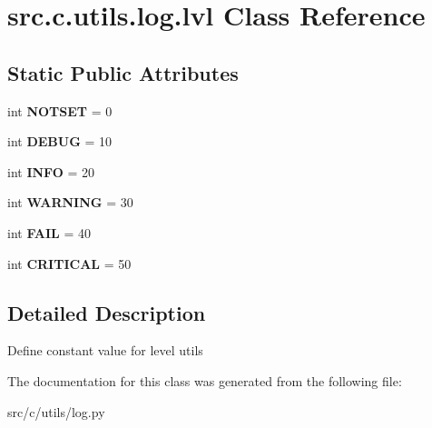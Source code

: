 \hypertarget{classsrc_1_1c_1_1utils_1_1log_1_1lvl}{}\section{src.\+c.\+utils.\+log.\+lvl Class Reference}
\label{classsrc_1_1c_1_1utils_1_1log_1_1lvl}
\subsection*{Static Public Attributes}
\begin{DoxyCompactItemize}
\item 
\hypertarget{classsrc_1_1c_1_1utils_1_1log_1_1lvl_a9bbcaecf1f99adf88eb3ecf7cfa8c391}{}int {\bfseries N\+O\+T\+S\+E\+T} = 0\label{classsrc_1_1c_1_1utils_1_1log_1_1lvl_a9bbcaecf1f99adf88eb3ecf7cfa8c391}

\item 
\hypertarget{classsrc_1_1c_1_1utils_1_1log_1_1lvl_ad3ffc0cd5665758a9b70816617df2f2d}{}int {\bfseries D\+E\+B\+U\+G} = 10\label{classsrc_1_1c_1_1utils_1_1log_1_1lvl_ad3ffc0cd5665758a9b70816617df2f2d}

\item 
\hypertarget{classsrc_1_1c_1_1utils_1_1log_1_1lvl_a8c26afd8a19d8f8fe1e30cb4aba6d89a}{}int {\bfseries I\+N\+F\+O} = 20\label{classsrc_1_1c_1_1utils_1_1log_1_1lvl_a8c26afd8a19d8f8fe1e30cb4aba6d89a}

\item 
\hypertarget{classsrc_1_1c_1_1utils_1_1log_1_1lvl_adb0565cc107642a6f45da4510ad2e0cd}{}int {\bfseries W\+A\+R\+N\+I\+N\+G} = 30\label{classsrc_1_1c_1_1utils_1_1log_1_1lvl_adb0565cc107642a6f45da4510ad2e0cd}

\item 
\hypertarget{classsrc_1_1c_1_1utils_1_1log_1_1lvl_a8931c338a25df0bb190d498eaeec474e}{}int {\bfseries F\+A\+I\+L} = 40\label{classsrc_1_1c_1_1utils_1_1log_1_1lvl_a8931c338a25df0bb190d498eaeec474e}

\item 
\hypertarget{classsrc_1_1c_1_1utils_1_1log_1_1lvl_ae2f03b567b46735ddf43fa48cfc5f1f3}{}int {\bfseries C\+R\+I\+T\+I\+C\+A\+L} = 50\label{classsrc_1_1c_1_1utils_1_1log_1_1lvl_ae2f03b567b46735ddf43fa48cfc5f1f3}

\end{DoxyCompactItemize}


\subsection{Detailed Description}
\begin{DoxyVerb}Define constant value for level utils
\end{DoxyVerb}
 

The documentation for this class was generated from the following file\+:\begin{DoxyCompactItemize}
\item 
src/c/utils/log.\+py\end{DoxyCompactItemize}
